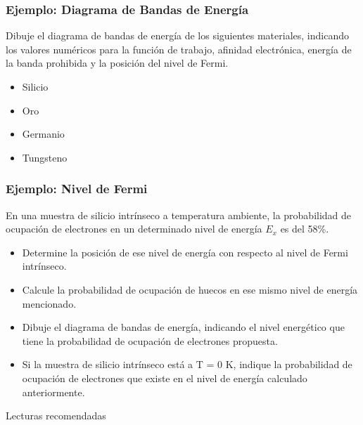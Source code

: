 \documentclass[10pt,t,aspectratio=169]{beamer}
\begin{document}
\begin{frame}[t]
    \frametitle{Ejemplo: Diagrama de Bandas de Energía}

    Dibuje el diagrama de bandas de energía de los siguientes materiales, indicando los valores numéricos para la función de trabajo, afinidad electrónica, energía de la banda prohibida y la posición del nivel de Fermi.

    \begin{itemize}
        \item Silicio
        \item Oro
        \item Germanio
        \item Tungsteno
    \end{itemize}
\end{frame}


\begin{frame}[t]
    \frametitle{Ejemplo: Nivel de Fermi}
    En una muestra de silicio intrínseco a temperatura ambiente, la probabilidad de ocupación de electrones en un determinado nivel de energía $E_x$ es del 58\%. 

    \begin{itemize}
        \item Determine la posición de ese nivel de energía con respecto al nivel de Fermi intrínseco.
        \item Calcule la probabilidad de ocupación de huecos en ese mismo nivel de energía mencionado.
        \item Dibuje el diagrama de bandas de energía, indicando el nivel energético que tiene la probabilidad de ocupación de electrones propuesta.
        \item Si la muestra de silicio intrínseco está a T = 0 K, indique la probabilidad de ocupación de electrones que existe en el nivel de energía calculado anteriormente.
    \end{itemize}
    
\end{frame}


\begin{frame}{Lecturas recomendadas}
    
\end{frame}
\end{document}

